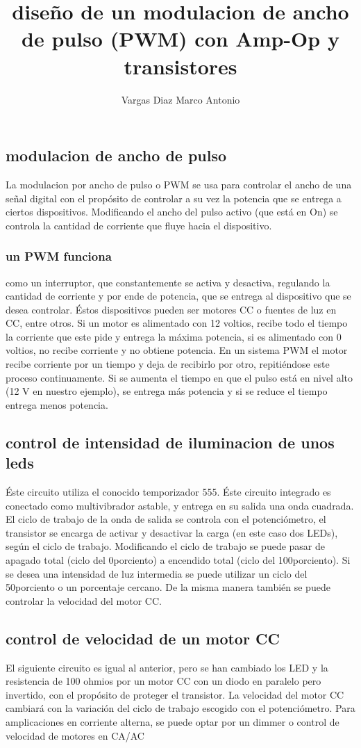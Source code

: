 \documentclass[11pt,a4paper]{article}
\author{Vargas Diaz Marco Antonio }
\title{diseño de un modulacion de ancho de pulso (PWM) con Amp-Op y transistores}
\begin{document}
\maketitle
\subsection{modulacion de ancho de pulso}
La modulacion por ancho de pulso o PWM se usa para controlar el ancho de una señal digital con el propósito de controlar a su vez la potencia que se entrega a ciertos dispositivos. Modificando el ancho del pulso activo (que está en On) se controla la cantidad de corriente que fluye hacia el dispositivo.

\subsubsection{un PWM funciona}
como un interruptor, que constantemente se activa y desactiva, regulando la cantidad de corriente y por ende de potencia, que se entrega al dispositivo que se desea controlar. Éstos dispositivos pueden ser motores CC o fuentes de luz en CC, entre otros.
Si un motor es alimentado con 12 voltios, recibe todo el tiempo la corriente que este pide y entrega la máxima potencia, si es alimentado con 0 voltios, no recibe corriente y no obtiene potencia.
En un sistema PWM el motor recibe corriente por un tiempo y deja de recibirlo por otro, repitiéndose este proceso continuamente. Si se aumenta el tiempo en que el pulso está en nivel alto (12 V en nuestro ejemplo), se entrega más potencia y si se reduce el tiempo entrega menos potencia.
 
\subsection{control de intensidad de iluminacion de unos leds}
Éste circuito utiliza el conocido temporizador 555. Éste circuito integrado es conectado como multivibrador astable, y entrega en su salida una onda cuadrada.
El ciclo de trabajo de la onda de salida se controla con el potenciómetro, el transistor se encarga de activar y desactivar la carga (en este caso dos LEDs), según el ciclo de trabajo.
Modificando el ciclo de trabajo se puede pasar de apagado total (ciclo del 0porciento) a encendido total (ciclo del 100porciento). Si se desea una intensidad de luz intermedia se puede utilizar un ciclo del 50porciento o un porcentaje cercano.
De la misma manera también se puede controlar la velocidad del motor CC.
\subsection{control de velocidad de un motor CC}
El siguiente circuito es igual al anterior, pero se han cambiado los LED y la resistencia de 100 ohmios  por un motor CC con un diodo en paralelo pero invertido, con el propósito de proteger el transistor.
La velocidad del motor CC cambiará con la variación del ciclo de trabajo escogido con el potenciómetro.
Para amplicaciones en corriente alterna, se puede optar por un dimmer o control de velocidad de motores en CA/AC
\end{document}

